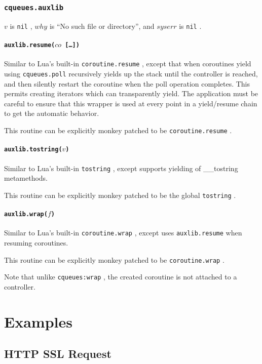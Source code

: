 \documentclass[11pt, oneside]{memoir}
\newcommand{\fn}[1]{\texttt{#1} }
\newcommand{\nil}[0]{\texttt{nil} }
\newcounter{toccols}
\newenvironment{Module}[1]{
	\subsection{\texttt{#1}}
	\addtocontents{toc}{
		\protect\begin{multicols}{\value{toccols}}
	}
}{
	\addtocontents{toc}{\protect\end{multicols}}
}
\begin{document}
\begin{Module}{cqueues.auxlib}
$v$ is \nil, $why$ is ``No such file or directory'', and $syserr$ is \nil.

\subsubsection[\fn{auxlib.resume}]{\fn{auxlib.resume($co$ […])}}

Similar to Lua's built-in \fn{coroutine.resume}, except that when coroutines yield using \fn{cqueues.poll} recursively yields up the stack until the controller is reached, and then silently restart the coroutine when the poll operation completes. This permits creating iterators which can transparently yield. The application must be careful to ensure that this wrapper is used at every point in a yield/resume chain to get the automatic behavior.

This routine can be explicitly monkey patched to be \fn{coroutine.resume}.

\subsubsection[\fn{auxlib.tostring}]{\fn{auxlib.tostring($v$)}}

Similar to Lua's built-in \fn{tostring}, except supports yielding of \_\_tostring metamethods.

This routine can be explicitly monkey patched to be the global \fn{tostring}.

\subsubsection[\fn{auxlib.wrap}]{\fn{auxlib.wrap($f$)}}

Similar to Lua's built-in \fn{coroutine.wrap}, except uses \fn{auxlib.resume} when resuming coroutines.

This routine can be explicitly monkey patched to be \fn{coroutine.wrap}.

Note that unlike \fn{cqueues:wrap}, the created coroutine is not attached to a controller.

\end{Module}


\chapter{Examples}

\section{HTTP SSL Request}
\end{document}
